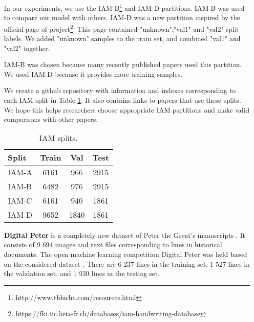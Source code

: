 \documentclass[10pt,twocolumn,letterpaper]{article}
\begin{document}
In our experiments, we use the IAM-B\footnote{http://www.tbluche.com/resources.html} and IAM-D partitions. IAM-B was used to compare our model with others. IAM-D was a new partition inspired by the official page of  project\footnote{https://fki.tic.heia-fr.ch/databases/iam-handwriting-database}. This page contained "unknown","val1" and "val2" split labels. We added "unknown" samples to the train set, and combined "val1" and "val2" together.

IAM-B was chosen because many recently published papers used this partition. We used IAM-D because it provides more training samples.

We create a github repository \cite{iam_splits} with information and indexes corresponding to each IAM split in Table \ref{tab:iam_split}. It also contains links to papers that use these splits. We hope this helps researchers choose appropriate IAM partitions and make valid comparisons with other papers.



\begin{table}\label{tab:iam_split}
  \begin{center}
    \begin{tabular}{ |l|c|c|c| }
    \hline
\textbf{Split} &  \textbf{Train} & \textbf{Val} & \textbf{Test} \\
\hline
    IAM-A & 6161 & 966 & 2915 \\
    IAM-B & 6482 & 976 & 2915 \\
    IAM-C & 6161 & 940 & 1861 \\
    IAM-D & 9652 & 1840 & 1861 \\
\hline
    \end{tabular}
    \end{center}
  \caption{IAM splits.}
\end{table}

\medskip
\noindent 
\textbf{Digital Peter} is a completely new dataset of Peter the Great's manuscripts \cite{potanin2021digital}. It consists of 9 694 images and text files corresponding to lines in historical documents. The open machine learning competition Digital Peter was held based on the considered dataset \cite{complink}. There are 6 237 lines in the training set, 1 527 lines in the validation set, and 1 930 lines in the testing set. 
\end{document}
